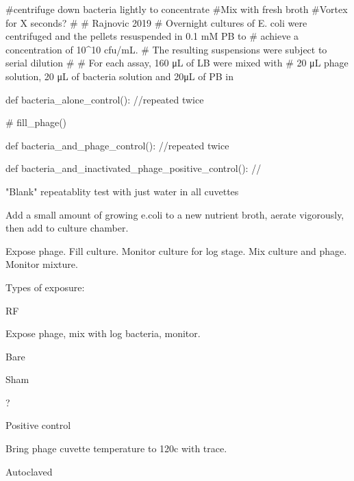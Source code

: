 \documentclass[paper.tex]{subfiles}%
\begin{document}
#centrifuge down bacteria lightly to concentrate
#Mix with fresh broth
#Vortex for X seconds?
#
# Rajnovic 2019
# Overnight cultures of E. coli were centrifuged and the pellets resuspended in 0.1 mM PB to
# achieve a concentration of 10^10 cfu/mL.
# The resulting suspensions were subject to serial dilution
#
# For each assay, 160 μL of LB were mixed with
# 20 μL phage solution, 20 μL of bacteria solution and 20μL of PB in


def bacteria_alone_control():
    //repeated twice

    # fill_phage()


def bacteria_and_phage_control():
    //repeated twice


def bacteria_and_inactivated_phage_positive_control():
    //

"Blank" repeatablity test with just water in all cuvettes


Add a small amount of growing e.coli to a new nutrient broth,
aerate vigorously, then add to culture chamber.

Expose phage.
Fill culture.
Monitor culture for log stage.
Mix culture and phage.
Monitor mixture.

Types of exposure:

RF

Expose phage, mix with log bacteria, monitor.

Bare

Sham

?

Positive control

Bring phage cuvette temperature to 120c with trace.



Autoclaved
\end{document}
